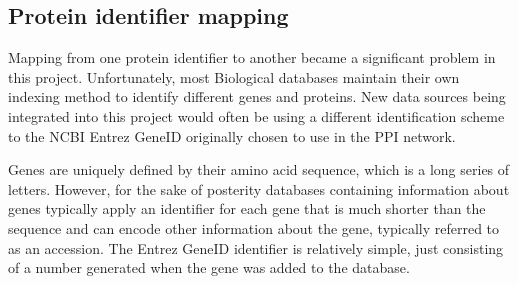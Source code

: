 \subsection{Protein identifier mapping}

Mapping from one protein identifier to another became a significant problem in this project.
Unfortunately, most Biological databases maintain their own indexing method to identify different genes and proteins.
New data sources being integrated into this project would often be using a different identification scheme to the NCBI Entrez GeneID originally chosen to use in the \ac{PPI} network.


Genes are uniquely defined by their amino acid sequence, which is a long series of letters.
However, for the sake of posterity databases containing information about genes typically apply an identifier for each gene that is much shorter than the sequence and can encode other information about the gene, typically referred to as an accession.
The Entrez GeneID identifier is relatively simple, just consisting of a number generated when the gene was added to the database\autocite{maglott_entrez_2007}.


